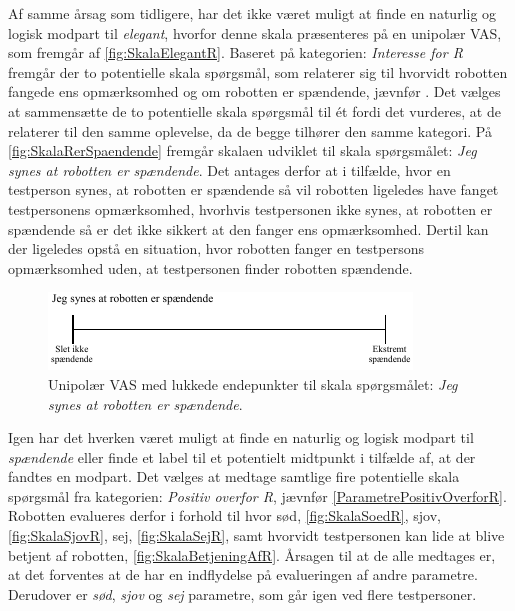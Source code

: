 \noindent
%
Af samme årsag som tidligere, har det ikke været muligt at finde en naturlig og logisk modpart til \textit{elegant}, hvorfor denne skala præsenteres på en unipolær VAS, som fremgår af \autoref{fig:SkalaElegantR}.\blankline
%
Baseret på kategorien: \textit{Interesse for R} fremgår der to potentielle skala spørgsmål, som relaterer sig til hvorvidt robotten fangede ens opmærksomhed og om robotten er spændende, jævnfør . Det vælges at sammensætte de to potentielle skala spørgsmål til ét fordi det vurderes, at de relaterer til den samme oplevelse, da de begge tilhører den samme kategori. På \autoref{fig:SkalaRerSpaendende} fremgår skalaen udviklet til skala spørgsmålet: \textit{Jeg synes at robotten er spændende}. Det antages derfor at i tilfælde, hvor en testperson synes, at robotten er spændende så vil robotten ligeledes have fanget testpersonens opmærksomhed, hvorhvis testpersonen ikke synes, at robotten er spændende så er det ikke sikkert at den fanger ens opmærksomhed. Dertil kan der ligeledes opstå en situation, hvor robotten fanger en testpersons opmærksomhed uden, at testpersonen finder robotten spændende.
\newpage
%
\begin{figure}[H]
\centering
\includegraphics[width =\textwidth]{Figure/UdvalgteSkalaer/RerSpaendende} 
\caption{Unipolær VAS med lukkede endepunkter til skala spørgsmålet: \textit{Jeg synes at robotten er spændende}.}
\label{fig:SkalaRerSpaendende}
\end{figure}
\noindent
%
Igen har det hverken været muligt at finde en naturlig og logisk modpart til \textit{spændende} eller finde et label til et potentielt midtpunkt i tilfælde af, at der fandtes en modpart.\blankline 
%
Det vælges at medtage samtlige fire potentielle skala spørgsmål fra kategorien: \textit{Positiv overfor R}, jævnfør \autoref{ParametrePositivOverforR}. Robotten evalueres derfor i forhold til hvor sød, \autoref{fig:SkalaSoedR}, sjov, \autoref{fig:SkalaSjovR}, sej, \autoref{fig:SkalaSejR}, samt hvorvidt testpersonen kan lide at blive betjent af robotten, \autoref{fig:SkalaBetjeningAfR}. Årsagen til at de alle medtages er, at det forventes at de har en indflydelse på evalueringen af andre parametre. Derudover er \textit{sød}, \textit{sjov} og \textit{sej} parametre, som går igen ved flere testpersoner. 

